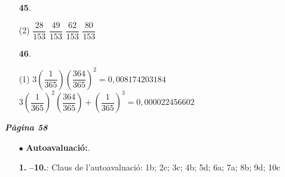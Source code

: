 \documentclass[a4paper, pdf, twoside]{book}
\begin{document}
\begin{multicols}{2}
\begin{enumerate}

 \item[\fontfamily{phv}\selectfont\color{blue}\textbf{45}. ]  \scalebox{0.6}{\simbolclau } 
 \begin{tasks}[column-sep=1em, item-indent=1.3333em](2)
	 \task $\dfrac {28}{153}$
	 \task $\dfrac {49}{153}$
	 \task $\dfrac {62}{153}$
	 \task $\dfrac {80}{153}$
\end{tasks}
\vspace{0.25cm}



 \item[\fontfamily{phv}\selectfont\color{blue}\textbf{46}. ] 
 \begin{tasks}[column-sep=1em, item-indent=1.3333em](1)
	 \task* $3\left (\dfrac {1}{365}\right )\left (\dfrac {364}{365}\right )^2 = 0,008174203184$
	 \task* $3 \left (\dfrac {1}{365}\right )^2 \left (\dfrac {364}{365}\right )+ \left (\dfrac {1}{365}\right )^3 = 0,000022456602$ 
\end{tasks}
 \end{enumerate}
\vspace{0.3cm}


{\textbf{\em Pàgina 58}} \hrulefill
\begin{enumerate}
\vspace{0.25cm}
 \item[$\bullet$ ] {\selectfont\color{blue}\textbf{Autoavaluació:}. }

 \end{enumerate}
\begin{enumerate}
\vspace{0.25cm}
\item[\fontfamily{phv}\selectfont\color{blue}\textbf{1. }]  \scalebox{0.6}{\simbolclau } 
\textbf {--10.}: Claus de l'autoavaluació: 1b; 2c; 3c; 4b; 5d; 6a; 7a; 8b; 9d; 10c
 \end{enumerate}
\vfill\null
\columnbreak
\def\currentname{Solucions del Tema 5}
\vspace*{0.75cm}

 

\vspace*{0.4cm}
 {}
\vspace{0.3cm}



\end{multicols}
\end{document}

